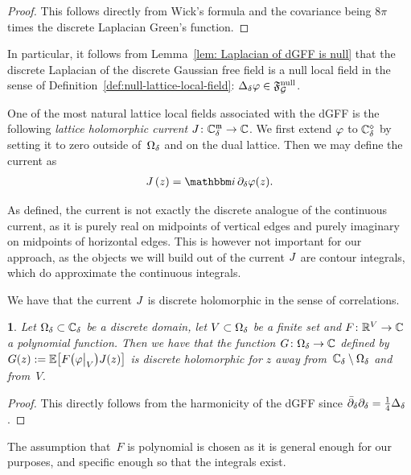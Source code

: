 \documentclass[12pt,oneside,english]{amsart}
\numberwithin{equation}{section}
\numberwithin{figure}{section}
\theoremstyle{plain}
\theoremstyle{plain}
\theoremstyle{plain}
\theoremstyle{plain}
\newtheorem{lem}[thm]{\protect\lemmaname}
\theoremstyle{remark}
\newtheorem{rem}[thm]{\protect\remarkname}
\theoremstyle{definition}
\theoremstyle{plain}
\theoremstyle{plain}
\numberwithin{thm}{section}
\newcommand{\kallemod}[1]{{\color{kallecol} {#1}}}
\providecommand{\lemmaname}{Lemma}
\providecommand{\remarkname}{Remark}
\providecommand{\lemmaname}{Lemma}
\providecommand{\remarkname}{Remark}
\providecommand{\lemmaname}{Lemma}
\providecommand{\remarkname}{Remark}
\providecommand{\lemmaname}{Lemma}
\providecommand{\remarkname}{Remark}
\begin{document}
\begin{proof}
This follows directly from Wick's formula and the covariance being
$8\pi$ times the discrete Laplacian Green's function.
\end{proof}
In particular, it follows from 
Lemma~\ref{lem: Laplacian of dGFF is null} that the discrete Laplacian of 
the discrete Gaussian free field is a null local field in the sense of 
Definition~\ref{def:null-lattice-local-field}:
${\Delta}_{{\delta}} {\varphi} \in \mathfrak{F}^\mathrm{null}_{\mathcal{G}}$.

One of the most natural lattice local fields associated with the dGFF
is the following
\emph{lattice holomorphic current} ${J} \colon {\mathbb{C}_{{\delta}}^{\mathfrak{m}}} \to  \mathbb{C} $.
We first extend ${\varphi}$ to ${\mathbb{C}_{{\delta}}^{\diamond}}$ by setting it to
zero outside of~${{\Omega}}_{{\delta}}$ and on the dual lattice.
Then we may define the current as
\begin{align*}
\curr \left( z \right) = \ii \, \ddee \DGFF (z) .
\end{align*}

As defined, the current is not exactly the discrete analogue of the
continuous current, as it is 
purely real on midpoints of vertical
edges and purely imaginary on midpoints of horizontal edges.
This is
however not important for our approach, as the objects we will build
out of the current ${J}$ are contour integrals, which do approximate
the continuous integrals. 

We have that the current ${J}$ is discrete holomorphic in the sense
of correlations. 
\begin{lem}
\label{lem:current-is-discrete-hol}Let ${{\Omega}}_{{\delta}}\subset{\mathbb{C}_{{\delta}}}$
be a discrete domain, let $V\subset{{\Omega}}_{{\delta}}$ be a finite set
and $F \colon  \mathbb{R}^{V} \to  \mathbb{C} $ a polynomial function. Then we
have that the function $G \colon {{\Omega}}_{{\delta}} \to  \mathbb{C} $ defined by
$G(z) := \mathbb{E} \! \left[ {
F\big({\varphi}\big|_{V}\big) {J} (z) } \right] $
is discrete holomorphic for $z$ away
from~${\mathbb{C}_{{\delta}}} \setminus {{\Omega}}_{{\delta}}$
and from~$V$. 
\end{lem}
\begin{proof}
This directly follows from the harmonicity of the dGFF since 
${{\bar{\partial}}}_{{\delta}} {\partial}_{{\delta}} = \frac{1}{4} {\Delta}_{{\delta}}$.
\end{proof}
The assumption that~$F$ is polynomial is chosen as it is general
enough for our purposes, and specific enough so that the integrals
exist. 
\end{document}
